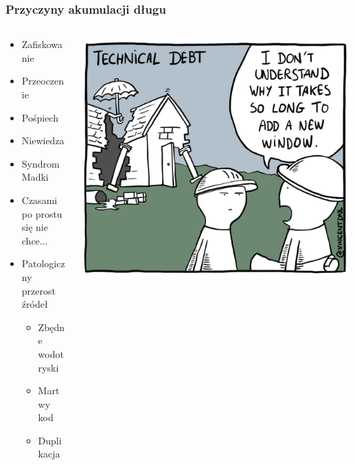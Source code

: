 \documentclass[xcolor=dvipsnames]{beamer}%
\begin{document}
\begin{frame}
	\frametitle{Przyczyny akumulacji długu}
	\begin{columns}
		\begin{column}{0.5\textwidth}
			\begin{itemize}
				\item Zafiskowanie
				\item Przeoczenie
				\item Pośpiech
				\item Niewiedza
				\item Syndrom Madki
				\item Czasami po prostu się nie chce...
				\item Patologiczny przerost źródeł
				      \begin{itemize}
					      \item Zbędne wodotryski
					      \item Martwy kod
					      \item Duplikacja
				      \end{itemize}
			\end{itemize}
		\end{column}
		\begin{column}{0.5\textwidth}
			\includegraphics[width=\textwidth,height=\textheight,keepaspectratio]{figure/dlug_techniczny.jpg}
		\end{column}
	\end{columns}
\end{frame}
\end{document}
